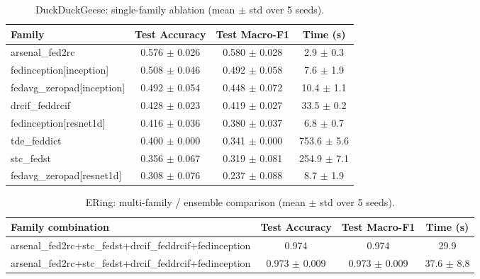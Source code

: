 \begin{table}[t]
\centering
\caption{DuckDuckGeese: single-family ablation (mean $\pm$ std over 5 seeds).}
\label{tab:results_duckduckgeese_ablation}
\begin{tabular}{lccc}
\toprule
Family & Test Accuracy & Test Macro-F1 & Time (s) \\
\midrule
arsenal\_fed2rc & 0.576 $\pm$ 0.026 & 0.580 $\pm$ 0.028 & 2.9 $\pm$ 0.3 \\
fedinception[inception] & 0.508 $\pm$ 0.046 & 0.492 $\pm$ 0.058 & 7.6 $\pm$ 1.9 \\
fedavg\_zeropad[inception] & 0.492 $\pm$ 0.054 & 0.448 $\pm$ 0.072 & 10.4 $\pm$ 1.1 \\
drcif\_feddrcif & 0.428 $\pm$ 0.023 & 0.419 $\pm$ 0.027 & 33.5 $\pm$ 0.2 \\
fedinception[resnet1d] & 0.416 $\pm$ 0.036 & 0.380 $\pm$ 0.037 & 6.8 $\pm$ 0.7 \\
tde\_feddict & 0.400 $\pm$ 0.000 & 0.341 $\pm$ 0.000 & 753.6 $\pm$ 5.6 \\
stc\_fedst & 0.356 $\pm$ 0.067 & 0.319 $\pm$ 0.081 & 254.9 $\pm$ 7.1 \\
fedavg\_zeropad[resnet1d] & 0.308 $\pm$ 0.076 & 0.237 $\pm$ 0.088 & 8.7 $\pm$ 1.9 \\
\bottomrule
\end{tabular}
\end{table}

\begin{table}[t]
\centering
\caption{ERing: multi-family / ensemble comparison (mean $\pm$ std over 5 seeds).}
\label{tab:results_ering_ensemble}
\begin{tabular}{lccc}
\toprule
Family combination & Test Accuracy & Test Macro-F1 & Time (s) \\
\midrule
arsenal\_fed2rc+stc\_fedst+drcif\_feddrcif+fedinception & 0.974 & 0.974 & 29.9 \\
arsenal\_fed2rc+stc\_fedst+drcif\_feddrcif+fedinception & 0.973 $\pm$ 0.009 & 0.973 $\pm$ 0.009 & 37.6 $\pm$ 8.8 \\
\bottomrule
\end{tabular}
\end{table}

